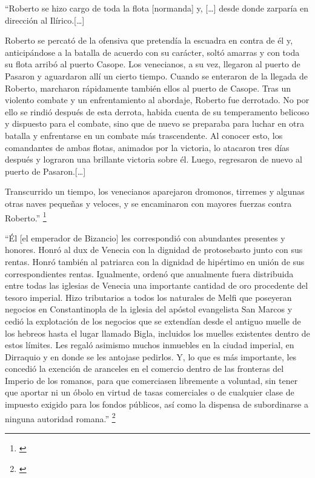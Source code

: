 “Roberto se hizo cargo de toda la flota [normanda] y, 
[…] desde donde zarparía en dirección al Ilírico.[…]

Roberto se percató de la ofensiva que pretendía la escuadra en contra 
de él y, anticipándose a la batalla de acuerdo con su carácter, soltó 
amarras y con toda su flota arribó al puerto Casope. Los venecianos, 
a su vez, llegaron al puerto de Pasaron y aguardaron allí un cierto 
tiempo. Cuando se enteraron de la llegada de Roberto, marcharon 
rápidamente también ellos al puerto de Casope. Tras un violento 
combate y un enfrentamiento al abordaje, Roberto fue derrotado. 
No por ello se rindió después de esta derrota, habida cuenta de su 
temperamento belicoso y dispuesto para el combate, sino que de nuevo 
se preparaba para luchar en otra batalla y enfrentarse en un 
combate más trascendente. Al conocer esto, los comandantes de ambas 
flotas, animados por la victoria, lo atacaron tres días después y 
lograron una brillante victoria sobre él. Luego, regresaron de 
nuevo al puerto de Pasaron.[…]

Transcurrido un tiempo, los venecianos aparejaron dromonos, 
tirremes y algunas otras naves pequeñas y veloces, y se 
encaminaron con mayores fuerzas contra Roberto.”
\footnote{\cite[pp.~250--252]{alexiadaVI}}

“Él [el emperador de Bizancio] les correspondió con abundantes presentes y
honores. Honró al dux de Venecia con la dignidad de protosebasto junto con 
sus rentas. Honró también al patriarca con la dignidad de hipértimo en 
unión de sus correspondientes rentas. Igualmente, ordenó que anualmente 
fuera distribuida entre todas las iglesias de Venecia una importante 
cantidad de oro procedente del tesoro imperial. Hizo tributarios a todos los 
naturales de Melfi que poseyeran negocios en Constantinopla de la 
iglesia del apóstol evangelista San Marcos y cedió la explotación de 
los negocios que se extendían desde el antiguo muelle de los hebreos 
hasta el lugar llamado Bigla, incluidos los muelles existentes dentro 
de estos límites. Les regaló asimismo muchos inmuebles en la ciudad 
imperial, en Dirraquio y en donde se les antojase pedirlos. Y, lo que 
es más importante, les concedió la exención de aranceles en el comercio 
dentro de las fronteras del Imperio de los romanos, para que comerciasen 
libremente a voluntad, sin tener que aportar ni un óbolo en virtud de tasas 
comerciales o de cualquier clase de impuesto exigido para los fondos 
públicos, así como la dispensa de subordinarse a ninguna autoridad romana.”
\footnote{\cite[p.~252]{alexiadaVI}}

